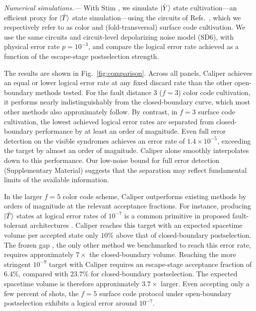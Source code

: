\documentclass[
    reprint,
    amsmath,amssymb,
    nofootinbib,
    superscriptaddress,
    aps,
    noeprint,
    longbibliography,
    prl
]{revtex4-2}
\theoremstyle{plain}
\begin{document}
\textit{Numerical simulations.---} With Stim \cite{gidney_stim_2021}, we simulate $\ket{\bar Y}$ state cultivation---an efficient proxy
for $\ket{\bar T}$ state simulation---using the circuits of Refs.~\cite{gidney_magic_2024,
sahay2026fold, scc_fd5_simulation}, which we respectively refer to as color and (fold-transversal) surface code cultivation. We use the
same circuits and circuit-level depolarizing noise model (SD6), with physical error rate
$p=10^{-3}$, and compare the logical error rate achieved as a function of the escape-stage
postselection strength.

The results are shown in Fig.~\ref{fig:comparison}. Across all panels, Caliper achieves an equal or
lower logical error rate at any fixed discard rate than the other open-boundary methods tested. For the fault distance 3
($f=3$) color code cultivation, it performs nearly indistinguishably from the closed-boundary curve,
which most other methods also approximately follow. By contrast, in $f=3$ surface code cultivation,
the lowest achieved logical error rates are separated from closed-boundary performance by at least
an order of magnitude. Even full error detection on the visible syndromes achieves an error rate of $1.4\times10^{-5}$,
exceeding the target by almost an order of magnitude. Caliper alone smoothly
interpolates down to this performance. Our low-noise bound for full error detection (Supplementary
Material) suggests that the separation may reflect fundamental limits of the available information.

In the larger $f=5$ color code scheme, Caliper outperforms existing methods by orders of magnitude
at the relevant acceptance fractions. For instance, producing $\ket{\bar T}$ states at logical error rates of $10^{-7}$ is a common primitive in proposed fault-tolerant architectures \cite{gidney_magic_2024, zhou_resource_2025, sun2026foldedsurfacecodearchitecture, fazio2025lowoverheadmagicstatecircuits, khalid2026impactsdecoderlatencyutilityscale}.
Caliper reaches this target with an expected spacetime volume per accepted state only $10\%$
above that of closed-boundary postselection. The frozen gap \cite{birchall_macromux_2026},
the only other method we benchmarked to reach this error rate, requires approximately $7\times$
the closed-boundary volume. Reaching the more stringent $10^{-9}$ target with Caliper
requires an escape-stage acceptance fraction of $6.4\%$, compared with $23.7\%$ for
closed-boundary postselection. The expected spacetime volume is therefore approximately
$3.7\times$ larger. Even accepting only a few percent of shots, the $f=5$ surface code protocol \cite{fault_distance_4} under open-boundary postselection exhibits a logical error around $10^{-7}$.
\end{document}
